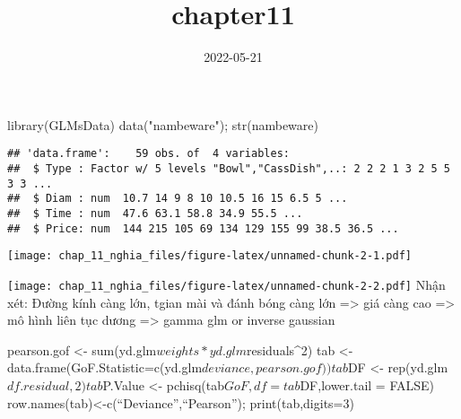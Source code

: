 \documentclass[
]{article}
\title{chapter11}
\author{}
\date{\vspace{-2.5em}2022-05-21}
\newenvironment{Shaded}{\begin{snugshade}}{\end{snugshade}}
\newcommand{\AttributeTok}[1]{\textcolor[rgb]{0.77,0.63,0.00}{#1}}
\newcommand{\FunctionTok}[1]{\textcolor[rgb]{0.00,0.00,0.00}{#1}}
\newcommand{\NormalTok}[1]{#1}
\newcommand{\SpecialCharTok}[1]{\textcolor[rgb]{0.00,0.00,0.00}{#1}}
\newcommand{\StringTok}[1]{\textcolor[rgb]{0.31,0.60,0.02}{#1}}
\begin{document}
\maketitle

\begin{Shaded}
\begin{Highlighting}[]
\FunctionTok{library}\NormalTok{(GLMsData)}
\FunctionTok{data}\NormalTok{(}\StringTok{"nambeware"}\NormalTok{); }\FunctionTok{str}\NormalTok{(nambeware)}
\end{Highlighting}
\end{Shaded}

\begin{verbatim}
## 'data.frame':    59 obs. of  4 variables:
##  $ Type : Factor w/ 5 levels "Bowl","CassDish",..: 2 2 2 1 3 2 5 5 3 3 ...
##  $ Diam : num  10.7 14 9 8 10 10.5 16 15 6.5 5 ...
##  $ Time : num  47.6 63.1 58.8 34.9 55.5 ...
##  $ Price: num  144 215 105 69 134 129 155 99 38.5 36.5 ...
\end{verbatim}

\begin{Shaded}
\end{Shaded}

\texttt{[image: chap\_11\_nghia\_files/figure-latex/unnamed-chunk-2-1.pdf]}

\begin{Shaded}
\end{Shaded}

\texttt{[image: chap\_11\_nghia\_files/figure-latex/unnamed-chunk-2-2.pdf]}
Nhận xét: Đường kính càng lớn, tgian mài và đánh bóng càng lớn
=\textgreater{} giá càng cao =\textgreater{} mô hình liên tục dương
=\textgreater{} gamma glm or inverse gaussian

pearson.gof \textless- sum(yd.glm\(weights*yd.glm\)residuals\^{}2) tab
\textless-data.frame(GoF.Statistic=c(yd.glm\(deviance, pearson.gof)) tab\)DF
\textless- rep(yd.glm\(df.residual,2) tab\)P.Value \textless-
pchisq(tab\(GoF,df=tab\)DF,lower.tail = FALSE)
row.names(tab)\textless-c(``Deviance'',``Pearson''); print(tab,digits=3)
\end{document}

